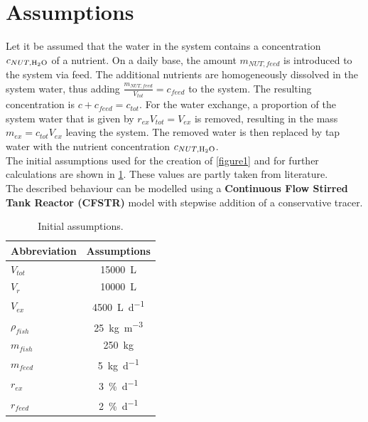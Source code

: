 \documentclass{scrartcl}
\begin{document}
\section{Assumptions}
Let it be assumed that the water in the system contains a concentration $c_{NUT, \ce{H2O}}$ of a nutrient. On a daily base, the amount $m_{NUT, feed}$ is introduced to the system via feed. The additional nutrients are homogeneously dissolved in the system water, thus adding $\frac{m_{NUT, feed}}{V_{tot}} = c_{feed}$ to the system. The resulting concentration is $c + c_{feed} = c_{tot}$. For the water exchange, a proportion of the system water that is given by $r_{ex}V_{tot} = V_{ex}$ is removed, resulting in the mass $m_{ex} = c_{tot}V_{ex}$ leaving the system. The removed water is then replaced by tap water with the nutrient concentration $c_{NUT, \ce{H2O}}$.\\
The initial assumptions used for the creation of \ref{figure1} and for further calculations are shown in \ref{tab:assumptions}. These values are partly taken from literature.\\
The described behaviour can be modelled using a \textbf{Continuous Flow Stirred Tank Reactor (CFSTR)} model with stepwise addition of a conservative tracer.






\begin{table}[!h]
\centering
  \caption{Initial assumptions.}
  \label{tab:assumptions}
  \vspace{5mm}
	\begin{tabular}{lc}

\toprule
 Abbreviation & Assumptions\\
\midrule
    
$V_{tot}$ & \SI{15000}{\liter}\\
$V_{r}$ & \SI{10000}{\liter}\\
$V_{ex}$ & \SI{4500}{\liter\per\day}\\
$\rho_{fish}$ & \SI{25}{\kilo\gram\per\cubic\meter}\\
$m_{fish}$ & \SI{250}{\kilo\gram}\\
$m_{feed}$ & \SI{5}{\kilo\gram\per\day}\\
$r_{ex}$ & \SI{3}{\percent\per\day}\\
$r_{feed}$ & \SI{2}{\percent\per\day}\\
\bottomrule

	\end{tabular}
\end{table}
\end{document}
